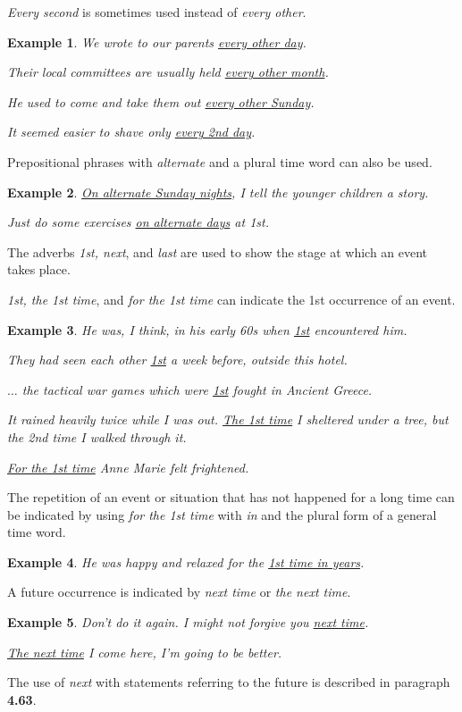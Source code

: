 \documentclass[oneside]{book}
\numberwithin{equation}{section}
\newtheorem{example}{Example}[section]
\begin{document}
\textit{Every second} is sometimes used instead of \textit{every other}.
\begin{example}
    We wrote to our parents \underline{every other day}.
    
    Their local committees are usually held \underline{every other month}.
    
    He used to come and take them out \underline{every other Sunday}.
    
    It seemed easier to shave only \underline{every 2nd day}.
\end{example}
Prepositional phrases with \textit{alternate} and a plural time word can also be used.
\begin{example}
    \underline{On alternate Sunday nights}, I tell the younger children a story.
    
    Just do some exercises \underline{on alternate days} at 1st.
\end{example}
%
\noindent{} The adverbs \textit{1st, next}, and \textit{last} are used to show the stage at which an event takes place.

%
\textit{1st, the 1st time}, and \textit{for the 1st time} can indicate the 1st occurrence of an event.
\begin{example}
    He was, I think, in his early 60s when \underline{1st} encountered him.
    
    They had seen each other \underline{1st} a week before, outside this hotel.
    
    $\ldots$ the tactical war games which were \underline{1st} fought in Ancient Greece.
    
    It rained heavily twice while I was out. \underline{The 1st time} I sheltered under a tree, but the 2nd time I walked through it.
    
    \underline{For the 1st time} Anne Marie felt frightened.
\end{example}
The repetition of an event or situation that has not happened for a long time can be indicated by using \textit{for the 1st time} with \textit{in} and the plural form of a general time word.
\begin{example}
    He was happy and relaxed for the \underline{1st time in years}.
\end{example}
A future occurrence is indicated by \textit{next time} or \textit{the next time}.
\begin{example}
    Don't do it again. I might not forgive you \underline{next time}.
    
    \underline{The next time} I come here, I'm going to be better.
\end{example}
The use of \textit{next} with statements referring to the future is described in paragraph \textbf{4.63}.
\end{document}
